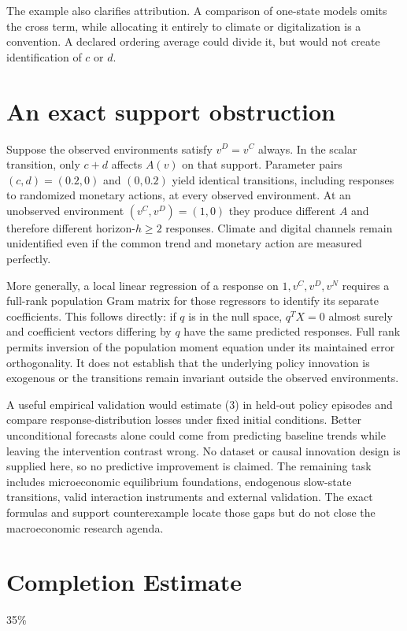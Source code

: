 \documentclass[11pt,a4paper]{article}
\begin{document}
The example also clarifies attribution. A comparison of one-state models omits the cross term, while allocating it entirely to climate or digitalization is a convention. A declared ordering average could divide it, but would not create identification of $c$ or $d$.

\section{An exact support obstruction}
Suppose the observed environments satisfy $v^D=v^C$ always. In the scalar transition, only $c+d$ affects $A(v)$ on that support. Parameter pairs $(c,d)=(0.2,0)$ and $(0,0.2)$ yield identical transitions, including responses to randomized monetary actions, at every observed environment. At an unobserved environment $(v^C,v^D)=(1,0)$ they produce different $A$ and therefore different horizon-$h\ge2$ responses. Climate and digital channels remain unidentified even if the common trend and monetary action are measured perfectly.

More generally, a local linear regression of a response on $1,v^C,v^D,v^N$ requires a full-rank population Gram matrix for those regressors to identify its separate coefficients. This follows directly: if $q$ is in the null space, $q^TX=0$ almost surely and coefficient vectors differing by $q$ have the same predicted responses. Full rank permits inversion of the population moment equation under its maintained error orthogonality. It does not establish that the underlying policy innovation is exogenous or the transitions remain invariant outside the observed environments.

A useful empirical validation would estimate (3) in held-out policy episodes and compare response-distribution losses under fixed initial conditions. Better unconditional forecasts alone could come from predicting baseline trends while leaving the intervention contrast wrong. No dataset or causal innovation design is supplied here, so no predictive improvement is claimed. The remaining task includes microeconomic equilibrium foundations, endogenous slow-state transitions, valid interaction instruments and external validation. The exact formulas and support counterexample locate those gaps but do not close the macroeconomic research agenda.

\section{Completion Estimate}
35\%
\end{document}
